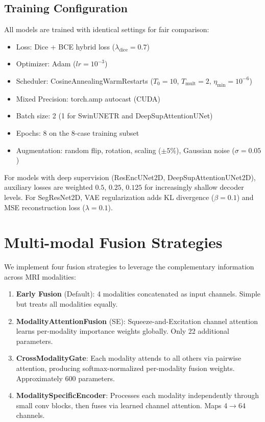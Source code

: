 \documentclass[11pt,a4paper]{article}
\begin{document}
\subsection{Training Configuration}
All models are trained with identical settings for fair comparison:
\begin{itemize}
  \item Loss: Dice + BCE hybrid loss ($\lambda_{\text{dice}}=0.7$)
  \item Optimizer: Adam ($lr=10^{-3}$)
  \item Scheduler: CosineAnnealingWarmRestarts ($T_0=10$, $T_{\text{mult}}=2$, $\eta_{\text{min}}=10^{-6}$)
  \item Mixed Precision: torch.amp autocast (CUDA)
  \item Batch size: 2 (1 for SwinUNETR and DeepSupAttentionUNet)
  \item Epochs: 8 on the 8-case training subset
  \item Augmentation: random flip, rotation, scaling ($\pm5\%$), Gaussian noise ($\sigma=0.05$)
\end{itemize}

For models with deep supervision (ResEncUNet2D, DeepSupAttentionUNet2D), auxiliary losses are weighted $0.5$, $0.25$, $0.125$ for increasingly shallow decoder levels. For SegResNet2D, VAE regularization adds KL divergence ($\beta=0.1$) and MSE reconstruction loss ($\lambda=0.1$).

\section{Multi-modal Fusion Strategies}
We implement four fusion strategies to leverage the complementary information across MRI modalities:

\begin{enumerate}
  \item \textbf{Early Fusion} (Default): 4 modalities concatenated as input channels. Simple but treats all modalities equally.
  \item \textbf{ModalityAttentionFusion} (SE): Squeeze-and-Excitation channel attention learns per-modality importance weights globally. Only 22 additional parameters.
  \item \textbf{CrossModalityGate}: Each modality attends to all others via pairwise attention, producing softmax-normalized per-modality fusion weights. Approximately 600 parameters.
  \item \textbf{ModalitySpecificEncoder}: Processes each modality independently through small conv blocks, then fuses via learned channel attention. Maps 4$\to$64 channels.
\end{enumerate}
\end{document}
